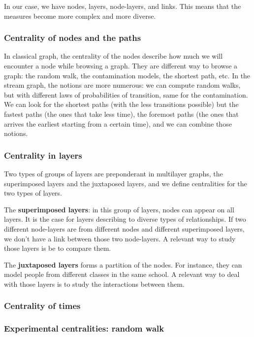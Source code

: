 \documentclass{svproc}
\begin{document}
In our case, we have nodes, layers, node-layers, and links. This means that the measures become more complex and more diverse.
%
\subsubsection{Centrality of nodes and the paths}
%
In classical graph, the centrality of the nodes describe how much we will encounter a node while browsing a graph. They are different way to browse a graph: the random walk, the contamination models, the shortest path, etc. In the stream graph, the notions are more numerous: we can compute random walks, but with different laws of probabilities of transition, same for the contamination. We can look for the shortest paths (with the less transitions possible) but the fastest paths (the ones that take less time), the foremost paths (the ones that arrives the earliest starting from a certain time), and we can combine those notions.



\subsubsection{Centrality in layers}

Two types of groups of layers are preponderant in multilayer graphs, the superimposed layers and the juxtaposed layers, and we define centralities for the two types of layers.

The {\bf superimposed layers}: in this group of layers, nodes can appear on all layers. It is the case for layers describing to diverse types of relationships. If two different node-layers are from different nodes and different superimposed layers, we don't have a link between those two node-layers. A relevant way to study those layers is be to compare them.

The {\bf juxtaposed layers} forms a partition of the nodes. For instance, they can model people from different classes in the same school. A relevant way to deal with those layers is to study the interactions between them.


\subsubsection{Centrality of times}
%

\subsubsection{Experimental centralities: random walk}
%
\end{document}

